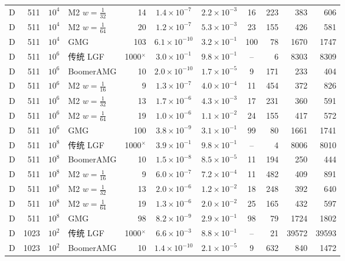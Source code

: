 \begin{longtable}{lrrlrcccrrr}
D & 511 & $10^{4}$ & M2 $w{=}\frac1{32}$ & 14 & $1.4{\times}10^{-7}$ & $2.2{\times}10^{-3}$ & 16 & 223 & 383 & 606 \\
D & 511 & $10^{4}$ & M2 $w{=}\frac1{64}$ & 20 & $1.2{\times}10^{-7}$ & $5.3{\times}10^{-3}$ & 23 & 155 & 426 & 581 \\
D & 511 & $10^{4}$ & GMG & 103 & $6.1{\times}10^{-10}$ & $3.2{\times}10^{-1}$ & 100 & 78 & 1670 & 1747 \\
D & 511 & $10^{6}$ & 传统 LGF & 1000$^\times$ & $3.0{\times}10^{-1}$ & $9.8{\times}10^{-1}$ & -- & 6 & 8303 & 8309 \\
D & 511 & $10^{6}$ & BoomerAMG & 10 & $2.0{\times}10^{-10}$ & $1.7{\times}10^{-5}$ & 9 & 171 & 233 & 404 \\
D & 511 & $10^{6}$ & M2 $w{=}\frac1{16}$ & 9 & $1.3{\times}10^{-7}$ & $4.0{\times}10^{-4}$ & 11 & 454 & 372 & 826 \\
D & 511 & $10^{6}$ & M2 $w{=}\frac1{32}$ & 13 & $1.7{\times}10^{-6}$ & $4.3{\times}10^{-3}$ & 17 & 231 & 360 & 591 \\
D & 511 & $10^{6}$ & M2 $w{=}\frac1{64}$ & 19 & $1.0{\times}10^{-6}$ & $1.1{\times}10^{-2}$ & 24 & 155 & 417 & 572 \\
D & 511 & $10^{6}$ & GMG & 100 & $3.8{\times}10^{-9}$ & $3.1{\times}10^{-1}$ & 99 & 80 & 1661 & 1741 \\
D & 511 & $10^{8}$ & 传统 LGF & 1000$^\times$ & $3.9{\times}10^{-1}$ & $9.8{\times}10^{-1}$ & -- & 4 & 8006 & 8010 \\
D & 511 & $10^{8}$ & BoomerAMG & 10 & $1.5{\times}10^{-8}$ & $8.5{\times}10^{-5}$ & 11 & 194 & 250 & 444 \\
D & 511 & $10^{8}$ & M2 $w{=}\frac1{16}$ & 9 & $6.0{\times}10^{-7}$ & $7.2{\times}10^{-4}$ & 11 & 482 & 409 & 891 \\
D & 511 & $10^{8}$ & M2 $w{=}\frac1{32}$ & 13 & $2.0{\times}10^{-6}$ & $1.2{\times}10^{-2}$ & 18 & 248 & 392 & 640 \\
D & 511 & $10^{8}$ & M2 $w{=}\frac1{64}$ & 19 & $1.3{\times}10^{-6}$ & $2.0{\times}10^{-2}$ & 25 & 165 & 432 & 597 \\
D & 511 & $10^{8}$ & GMG & 98 & $8.2{\times}10^{-9}$ & $2.9{\times}10^{-1}$ & 98 & 79 & 1724 & 1802 \\
D & 1023 & $10^{2}$ & 传统 LGF & 1000$^\times$ & $6.6{\times}10^{-3}$ & $8.8{\times}10^{-1}$ & -- & 21 & 39572 & 39593 \\
D & 1023 & $10^{2}$ & BoomerAMG & 10 & $1.4{\times}10^{-10}$ & $2.1{\times}10^{-5}$ & 9 & 632 & 840 & 1472 \\

\end{longtable}
